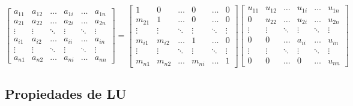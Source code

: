 \[
\begin{bmatrix}
a_{11} & a_{12} & \ldots & a_{1i} & \ldots & a_{1n} \\
a_{21} & a_{22} & \ldots & a_{2i} & \ldots & a_{2n} \\
\vdots & \vdots & \ddots & \vdots & \ddots & \vdots \\
a_{i1} & a_{i2} & \ldots & a_{ii} & \ldots & a_{in} \\
\vdots & \vdots & \ddots & \vdots & \ddots & \vdots \\
a_{n1} & a_{n2} & \ldots & a_{ni} & \ldots & a_{nn}
\end{bmatrix}
=
\begin{bmatrix}
1 & 0 & \ldots & 0 & \ldots & 0 \\
m_{21} & 1 & \ldots & 0 & \ldots & 0 \\
\vdots & \vdots & \ddots & \vdots & \ddots & \vdots \\
m_{i1} & m_{i2} & \ldots & 1 & \ldots & 0 \\
\vdots & \vdots & \ddots & \vdots & \ddots & \vdots \\
m_{n1} & m_{n2} & \ldots & m_{ni} & \ldots & 1
\end{bmatrix}
\begin{bmatrix}
u_{11} & u_{12} & \ldots & u_{1i} & \ldots & u_{1n} \\
0 & u_{22} & \ldots & u_{2i} & \ldots & u_{2n} \\
\vdots & \vdots & \ddots & \vdots & \ddots & \vdots \\
0 & 0 & \ldots & a_{ii} & \ldots & u_{in} \\
\vdots & \vdots & \ddots & \vdots & \ddots & \vdots \\
0 & 0 & \ldots & 0 & \ldots & u_{nn}
\end{bmatrix}
\]

\subsection{Propiedades de LU}\label{subsec:propiedades_de_lu}

